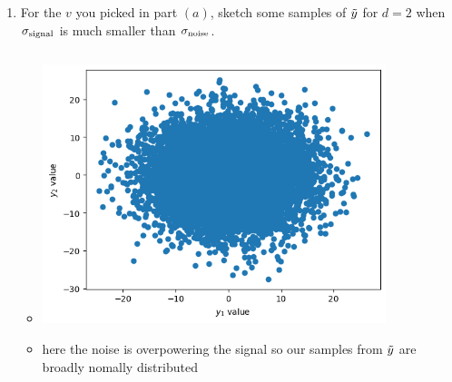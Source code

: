 \documentclass[12pt,twoside]{article}
\begin{document}
\begin{enumerate}
\begin{enumerate}
\item For the $v$ you picked in part $(a)$, sketch some samples of $\tilde{  y }$ for $d=2$ when $\sigma_{\operatorname{signal}}$ is much smaller than $\sigma_{\operatorname{noise}}$.  
\begin{itemize}
    \color{blue}
    \item \inputminted[firstline=95, lastline=98, breaklines=True]{python}{hw8.py}
    \includegraphics[width=10cm]{homework/homework_8/images/h8_3.png}
    \item here the noise is overpowering the signal so our samples from $\Tilde{y}$ are broadly nomally distributed 
\end{itemize}


\end{enumerate}
\end{enumerate}
\end{document}
